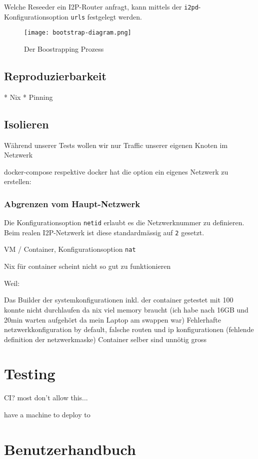 Welche Reseeder ein I2P-Router anfragt, kann mittels der \lstinline|i2pd|-Konfigurationsoption \lstinline|urls| festgelegt werden.


\clearpage
\begin{landscape}%
\begin{figure*}[ht]
  \texttt{[image: bootstrap-diagram.png]}
  \caption{Der Boostrapping Prozess}\label{fig:bootstrap-diagram}
\end{figure*}
\end{landscape}%


\subsection{Reproduzierbarkeit}

* Nix
* Pinning
    
\cite{noauthor_nixops_nodate-5}


\subsection{Isolieren}

Während unserer Tests wollen wir nur Traffic unserer eigenen Knoten im Netzwerk 

docker-compose respektive docker hat die option ein eigenes Netzwerk zu erstellen:

\subsubsection{Abgrenzen vom Haupt-Netzwerk}

Die Konfigurationsoption \lstinline|netid| erlaubt es die Netzwerknummer zu definieren.
Beim realen I2P-Netzwerk ist diese standardmässig auf \lstinline|2| gesetzt.

VM / Container, Konfigurationsoption \lstinline|nat|

Nix für container scheint nicht so gut zu funktionieren

Weil:

Das Builder der systemkonfigurationen inkl. der container getestet mit 100 konnte nicht durchlaufen da nix viel memory braucht (ich habe nach 16GB und 20min warten aufgehört da mein Laptop am swappen war)
Fehlerhafte netzwerkkonfiguration by default, falsche routen und ip konfigurationen (fehlende definition der netzwerkmaske)
Container selber sind unnötig gross

\section{Testing}

CI? most don't allow this...

have a machine to deploy to

\section{Benutzerhandbuch}


